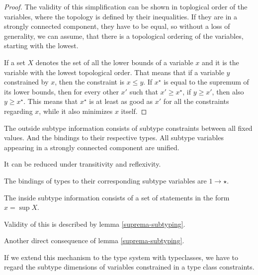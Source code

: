 \begin{proof}
The validity of this simplification can be shown in toplogical order of the variables, where the topology is defined by their inequalities. If they are in a strongly connected component, they have to be equal, so without a loss of generality, we can assume, that there is a topological ordering of the variables, starting with the lowest.

If a set $X$ denotes the set of all the lower bounds of a variable $x$ and it is the variable with the lowest topological order. That means that if a variable $y$ constrained by $x$, then the constraint is $x \leq y$. If $x^\star$ is equal to the supremum of its lower bounds, then for every other $x'$ such that $x' \geq x^\star$, if $y \geq x'$, then also $y \geq x^\star$. This means that $x^\star$ is at least as good as $x'$ for all the constraints regarding $x$, while it also minimizes $x$ itself.
\end{proof}

\begin{defn}
    The outside subtype information consists of subtype constraints between all fixed values. And the bindings to their respective types. All subtype variables appearing in a strongly connected component are unified. 

    It can be reduced under transitivity and reflexivity.
\end{defn}

\begin{cor}
    The bindings of types to their corresponding subtype variables are $1 \to \star$.
\end{cor}

\begin{defn}
    The inside subtype information consists of a set of statements in the form $x = \sup X$.

    Validity of this is described by lemma \ref{suprema-subtyping}.
\end{defn}

\begin{cor}

    Another direct consequence of lemma \ref{suprema-subtyping}.
\end{cor}

If we extend this mechanism to the type system with typeclasses, we have to regard the subtype dimensions of variables constrained in a type class constraints.

